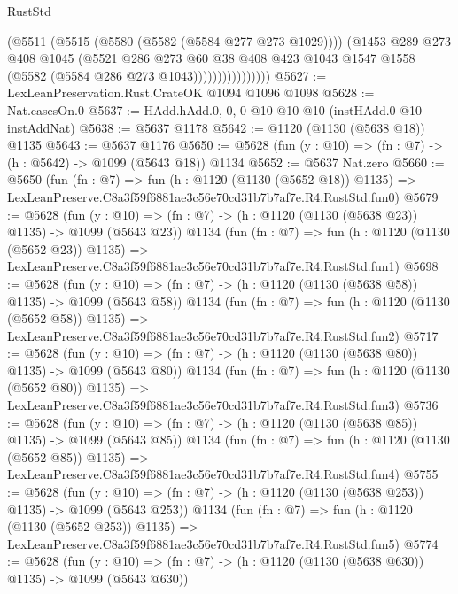 \begin{lexlean}{RustStd}
\begin{coremodule}
                          (@5511
                            (@5515 (@5580 (@5582 (@5584 @277 @273 @1029))))
                            (@1453
                              @289
                              @273
                              @408
                              @1045
                              (@5521
                                @286
                                @273
                                @60
                                @38
                                @408
                                @423
                                @1043
                                @1547
                                @1558
                                (@5582 (@5584 @286 @273 @1043))))))))))))))))
@5627 := LexLeanPreservation.Rust.CrateOK @1094 @1096 @1098
@5628 := Nat.casesOn.{0}
@5637 := HAdd.hAdd.{0, 0, 0} @10 @10 @10 (instHAdd.{0} @10 instAddNat)
@5638 := @5637 @1178
@5642 := @1120 (@1130 (@5638 @18)) @1135
@5643 := @5637 @1176
@5650 := @5628 (fun (y : @10) => (fn : @7) -> (h : @5642) -> @1099 (@5643 @18)) @1134
@5652 := @5637 Nat.zero
@5660 := @5650
    (fun (fn : @7) =>
    fun (h : @1120 (@1130 (@5652 @18)) @1135) =>
    LexLeanPreserve.C8a3f59f6881ae3c56e70cd31b7b7af7e.R4.RustStd.fun0)
@5679 := @5628
    (fun (y : @10) => (fn : @7) -> (h : @1120 (@1130 (@5638 @23)) @1135) -> @1099 (@5643 @23))
    @1134
    (fun (fn : @7) =>
    fun (h : @1120 (@1130 (@5652 @23)) @1135) =>
    LexLeanPreserve.C8a3f59f6881ae3c56e70cd31b7b7af7e.R4.RustStd.fun1)
@5698 := @5628
    (fun (y : @10) => (fn : @7) -> (h : @1120 (@1130 (@5638 @58)) @1135) -> @1099 (@5643 @58))
    @1134
    (fun (fn : @7) =>
    fun (h : @1120 (@1130 (@5652 @58)) @1135) =>
    LexLeanPreserve.C8a3f59f6881ae3c56e70cd31b7b7af7e.R4.RustStd.fun2)
@5717 := @5628
    (fun (y : @10) => (fn : @7) -> (h : @1120 (@1130 (@5638 @80)) @1135) -> @1099 (@5643 @80))
    @1134
    (fun (fn : @7) =>
    fun (h : @1120 (@1130 (@5652 @80)) @1135) =>
    LexLeanPreserve.C8a3f59f6881ae3c56e70cd31b7b7af7e.R4.RustStd.fun3)
@5736 := @5628
    (fun (y : @10) => (fn : @7) -> (h : @1120 (@1130 (@5638 @85)) @1135) -> @1099 (@5643 @85))
    @1134
    (fun (fn : @7) =>
    fun (h : @1120 (@1130 (@5652 @85)) @1135) =>
    LexLeanPreserve.C8a3f59f6881ae3c56e70cd31b7b7af7e.R4.RustStd.fun4)
@5755 := @5628
    (fun (y : @10) => (fn : @7) -> (h : @1120 (@1130 (@5638 @253)) @1135) -> @1099 (@5643 @253))
    @1134
    (fun (fn : @7) =>
    fun (h : @1120 (@1130 (@5652 @253)) @1135) =>
    LexLeanPreserve.C8a3f59f6881ae3c56e70cd31b7b7af7e.R4.RustStd.fun5)
@5774 := @5628
    (fun (y : @10) => (fn : @7) -> (h : @1120 (@1130 (@5638 @630)) @1135) -> @1099 (@5643 @630))

\end{coremodule}
\end{lexlean}
